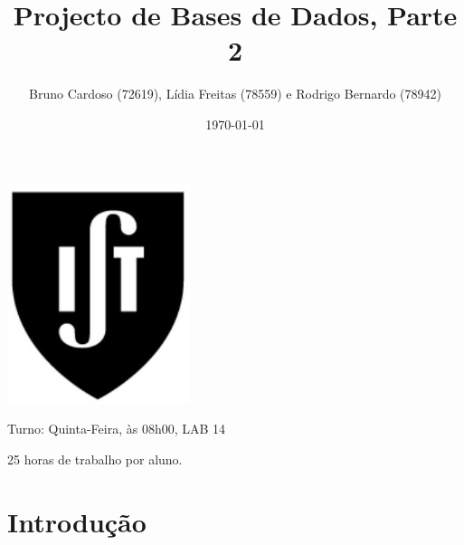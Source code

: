 \documentclass[11pt,a4paper]{article}
\title{\textbf{Projecto de Bases de Dados, Parte 2}}
\author{Bruno Cardoso (72619), Lídia Freitas (78559) e Rodrigo Bernardo (78942)}
\affil{Instituto Superior Técnico}
\begin{document}
\date {\today}

\maketitle

\centerline{\includegraphics[width=0.4\textwidth]{ist-simbolo.jpg}}

\begin{description}[noitemsep]
	\item {}
	\item Turno: Quinta-Feira, às 08h00, LAB 14
	\item 25 horas de trabalho por aluno.
\end{description}

\newpage

\tableofcontents
\newpage

\section{Introdução}
\newpage
\end{document}
